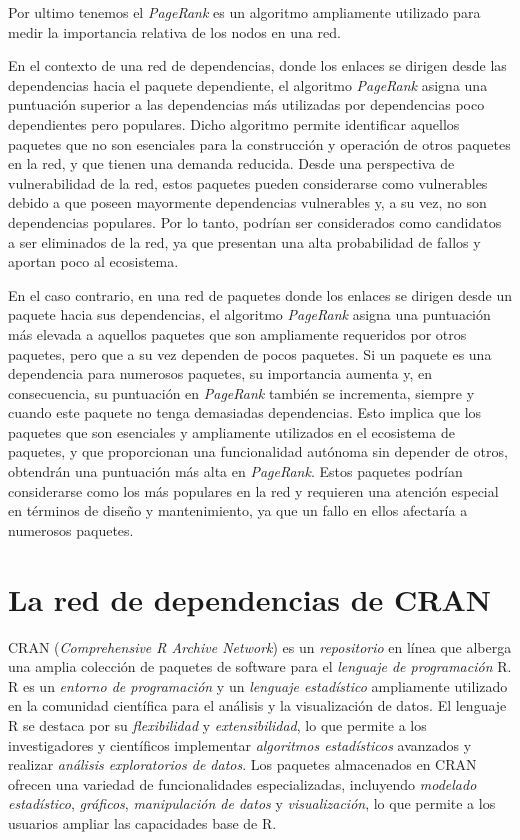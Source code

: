 Por ultimo tenemos el \emph{PageRank} es un algoritmo ampliamente utilizado para medir la importancia relativa
de los nodos en una red.

En el contexto de una red de dependencias, donde los enlaces se dirigen desde las dependencias hacia el paquete
dependiente, el algoritmo \emph{PageRank} asigna una puntuación superior a las dependencias más utilizadas por
dependencias poco dependientes pero populares. Dicho algoritmo permite identificar aquellos paquetes que no son
esenciales para la construcción y operación de otros paquetes en la red, y que tienen una demanda reducida.
Desde una perspectiva de vulnerabilidad de la red, estos paquetes pueden considerarse como vulnerables debido a
que poseen mayormente dependencias vulnerables y, a su vez, no son dependencias populares. Por lo tanto, podrían ser considerados
como candidatos a ser eliminados de la red, ya que presentan una alta probabilidad de fallos y aportan poco al ecosistema.

En el caso contrario, en una red de paquetes donde los enlaces se dirigen desde un paquete hacia sus dependencias,
el algoritmo \emph{PageRank} asigna una puntuación más elevada a aquellos paquetes que son ampliamente requeridos
por otros paquetes, pero que a su vez dependen de pocos paquetes. Si un paquete es una dependencia para numerosos
paquetes, su importancia aumenta y, en consecuencia, su puntuación en \emph{PageRank} también se incrementa, siempre
y cuando este paquete no tenga demasiadas dependencias. Esto implica que los paquetes que son esenciales y ampliamente
utilizados en el ecosistema de paquetes, y que proporcionan una funcionalidad autónoma sin depender de otros,
obtendrán una puntuación más alta en \emph{PageRank}. Estos paquetes podrían considerarse como los más populares
en la red y requieren una atención especial en términos de diseño y mantenimiento, ya que un fallo en ellos afectaría
a numerosos paquetes.

\section{La red de dependencias de CRAN}

CRAN (\textit{Comprehensive R Archive Network}) es un \textit{repositorio} en línea que alberga
una amplia colección de paquetes de software para el \textit{lenguaje de programación} R.
R es un \textit{entorno de programación} y un \textit{lenguaje estadístico} ampliamente
utilizado en la comunidad científica para el análisis y la visualización de datos.
El lenguaje R se destaca por su \textit{flexibilidad} y \textit{extensibilidad},
lo que permite a los investigadores y científicos implementar \textit{algoritmos estadísticos}
avanzados y realizar \textit{análisis exploratorios de datos}.
Los paquetes almacenados en CRAN ofrecen una variedad de funcionalidades especializadas,
incluyendo \textit{modelado estadístico}, \textit{gráficos}, \textit{manipulación de datos}
y \textit{visualización}, lo que permite a los usuarios ampliar las capacidades base de R.

